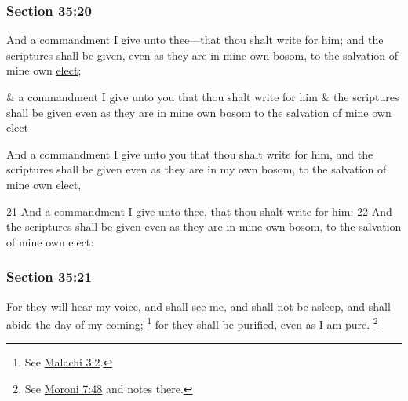 
	\subsubsection{Section 35:20} %
		\label{DC35-20}

		And a commandment I give unto thee---that thou shalt write for him; and the scriptures shall be given, even as they are in mine own bosom, to the salvation of mine own \hyperref[ELECTION]{elect};

		\begin{framed}
		\scriptsize
			\begin{compactdesc}
				\item[JSP] \& a commandment I give unto you that thou shalt write for him \& the scriptures shall be given even as they are in mine own bosom to the salvation of mine own elect
				\item[Rider] And a commandment I give unto you that thou shalt write for him, and the scriptures shall be given even as they are in my own bosom, to the salvation of mine own elect,
				\item[BC] 21 And a commandment I give unto thee, that thou shalt write for him: 22 And the scriptures shall be given even as they are in mine own bosom, to the salvation of mine own elect:
			\end{compactdesc}
		\end{framed}

	\subsubsection{Section 35:21} %
		\label{DC35-21}

		For they will hear my voice, and shall see me, and shall not be asleep, and shall abide the day of my coming;%
			\footnote{%
				See \hyperref[MALACHI-3-2]{Malachi 3:2}.
				}
		for they shall be purified, even as I am pure.%
			\footnote{%
				See \hyperref[MORONI-7-48]{Moroni 7:48} and notes there.
				}

